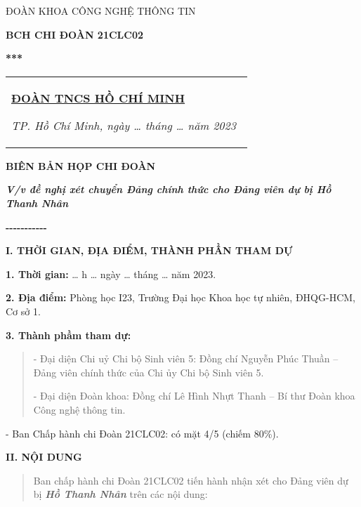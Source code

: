 \documentclass[]{article}
\date{}
\begin{document}
\begin{minipage}{0.45\textwidth}
\begin{center}
ĐOÀN KHOA CÔNG NGHỆ THÔNG TIN

\textbf{BCH CHI ĐOÀN 21CLC02}

\textbf{***}
\end{center}

\end{minipage}%
\hfill
\begin{minipage}{0.45\textwidth}
\begin{tabular}{p{\textwidth}}
\begin{center}
{\fontsize{14}{20pt}\textbf{\underline{ĐOÀN TNCS HỒ CHÍ MINH}}}

\vspace{\baselineskip}

\emph{TP. Hồ Chí Minh, ngày \ldots{} tháng \ldots{} năm 2023}\ 
\end{center}
\end{tabular}
\end{minipage}%

\begin{center}
{\fontsize{14}{20pt} \textbf{BIÊN BẢN HỌP CHI ĐOÀN}}

\textit{\textbf{V/v đề nghị xét chuyển Đảng chính thức cho Đảng viên dự bị
Hồ Thanh Nhân}}

\textbf{-\/-\/-\/-\/-\/-\/-\/-\/-\/-\/-}
\end{center}
\textbf{I. THỜI GIAN, ĐỊA ĐIỂM, THÀNH PHẦN THAM DỰ}

\textbf{1. Thời gian:} \ldots{}  h  \ldots{} ngày \ldots{} tháng \ldots{}
năm 2023.

\textbf{2. Địa điểm:} Phòng học I23, Trường Đại học Khoa học tự nhiên,
ĐHQG-HCM, Cơ sở 1.

\textbf{3. Thành phầm tham dự:}

\begin{quote}
- Đại diện Chi uỷ Chi bộ Sinh viên 5: Đồng chí Nguyễn Phúc Thuần -- Đảng
viên chính thức của Chi ủy Chi bộ Sinh viên 5.

- Đại diện Đoàn khoa: Đồng chí Lê Hình Nhựt Thanh -- Bí thư Đoàn khoa
Công nghệ thông tin.
\end{quote}

- Ban Chấp hành chi Đoàn 21CLC02: có mặt 4/5 (chiếm 80\%).

\textbf{II. NỘI DUNG}

\begin{quote}
Ban chấp hành chi Đoàn 21CLC02 tiến hành nhận xét cho Đảng viên dự bị
\emph{\textbf{Hồ Thanh Nhân}} trên các nội dung:
\end{quote}
\end{document}
